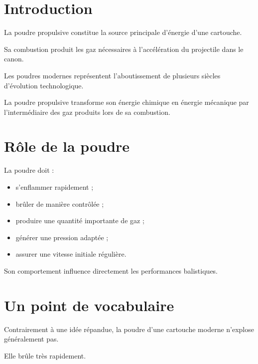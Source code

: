 
\section{Introduction}

La poudre propulsive constitue la source principale d'énergie d'une
cartouche.

Sa combustion produit les gaz nécessaires à l'accélération du projectile
dans le canon.

Les poudres modernes représentent l'aboutissement de plusieurs siècles
d'évolution technologique.

\begin{aretenir}

La poudre propulsive transforme son énergie chimique en énergie mécanique
par l'intermédiaire des gaz produits lors de sa combustion.

\end{aretenir}

\section{Rôle de la poudre}

La poudre doit :

\begin{itemize}
    \item s'enflammer rapidement ;
    \item brûler de manière contrôlée ;
    \item produire une quantité importante de gaz ;
    \item générer une pression adaptée ;
    \item assurer une vitesse initiale régulière.
\end{itemize}

Son comportement influence directement les performances balistiques.

\section{Un point de vocabulaire}

Contrairement à une idée répandue, la poudre d'une cartouche moderne
n'explose généralement pas.

Elle brûle très rapidement.

